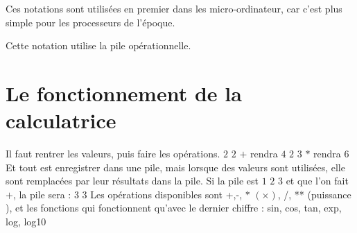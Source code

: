 \documentclass[a4paper]{article}
\begin{document}
Ces notations sont utilisées en premier dans les micro-ordinateur, car c'est plus simple pour les processeurs de l'époque.

Cette notation utilise la pile opérationnelle.

\section{Le fonctionnement de la calculatrice}

Il faut rentrer les valeurs, puis faire les opérations.
\smallbreak
$2$ $2$ $+$ rendra $4$
\smallbreak
$2$ $3$ $*$ rendra $6$
\smallbreak
Et tout est enregistrer dans une pile, mais lorsque des valeurs sont utilisées, elle sont remplacées par leur résultats dans la pile.
\smallbreak
Si la pile est
\smallbreak
$1$
\smallbreak
$2$
\smallbreak
$3$
\smallbreak
et que l'on fait $+$, la pile sera : 
\smallbreak
$3$
\smallbreak
$3$
\smallbreak
Les opérations disponibles sont +,-, $*$ $(\times)$, /, ** (puissance ), et les fonctions qui fonctionnent qu'avec le dernier chiffre : sin, cos, tan, exp, log, log10 
\end{document}

